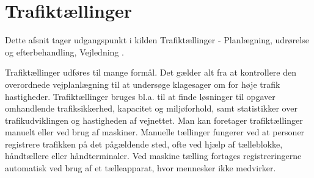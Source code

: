 \section{Trafiktællinger}
\label{sub:trafiktaellinger}
Dette afsnit tager udgangspunkt i kilden Trafiktællinger - Planlægning, udrørelse og efterbehandling, Vejledning .

Trafiktællinger udføres til mange formål. Det gælder alt fra at kontrollere den overordnede vejplanlægning til at undersøge klagesager om for høje trafik hastigheder. Trafiktællinger bruges bl.a. til at finde løsninger til opgaver omhandlende trafiksikkerhed, kapacitet og miljøforhold, samt statistikker over trafikudviklingen og hastigheden af vejnettet. Man kan foretager trafiktællinger manuelt eller ved brug af maskiner.
Manuelle tællinger fungerer ved at personer registrere trafikken på det pågældende sted, ofte ved hjælp af tælleblokke, håndtællere eller håndterminaler. Ved maskine tælling fortages registreringerne automatisk ved brug af et tælleapparat, hvor mennesker ikke medvirker.

